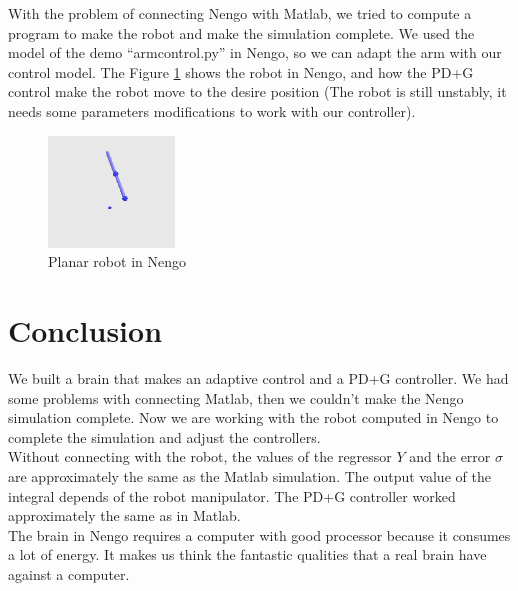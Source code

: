 With the problem of connecting Nengo with Matlab, we tried to compute a program to make the robot and make the simulation complete. We used the model of the demo ``armcontrol.py'' in Nengo, so we can adapt the arm with our control model. The Figure \ref{fig:pend} shows the robot in Nengo, and how the PD+G control make the robot move to the desire position (The robot is still unstably, it needs some parameters modifications to work with our controller).
\begin{figure}[h]
\centering
\includegraphics[width=0.3\textwidth]{imagenes/6-neuronal/pend.png}
 \caption{Planar robot in Nengo}
 \label{fig:pend}
\end{figure}
\section{Conclusion}
We built a brain that makes an adaptive control and a PD+G controller. We had some problems with connecting Matlab, then we couldn't make the Nengo simulation complete. Now we are working with the robot computed in Nengo to complete the simulation and adjust the controllers.\\

Without connecting with the robot, the values of the regressor $Y$ and the error $\sigma$ are approximately the same as the Matlab simulation. The output value of the integral depends of the robot manipulator. The PD+G controller worked approximately the same as in Matlab.\\

The brain in Nengo requires a computer with good processor because it consumes a lot of energy. It makes us think the fantastic qualities that a real brain have against a computer.




% 
